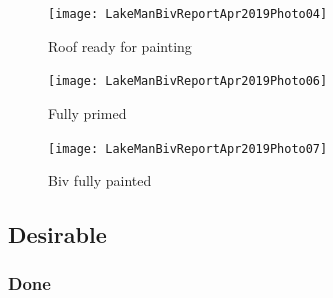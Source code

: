 \documentclass[12pt]{article} %
\begin{document}
\begin{figure}[ht]
\begin{minipage}{.5\linewidth}
\begin{flushleft}
  \texttt{[image: LakeManBivReportApr2019Photo04]}
  \caption{Roof ready for painting}
  \label{LMB4}
\end{flushleft}
\end{minipage}
\begin{minipage}{.5\linewidth}
\begin{center}
  \texttt{[image: LakeManBivReportApr2019Photo06]}
  \caption{Fully primed}
  \label{LMB6}
\end{center}
\end{minipage}
\end{figure}

\begin{figure}[ht]
\begin{minipage}{.5\linewidth}
\begin{flushleft}
  \texttt{[image: LakeManBivReportApr2019Photo07]}
  \caption{Biv fully painted}
  \label{LMB7}
\end{flushleft}
\end{minipage}
\end{figure}

\subsection{Desirable}

\subsubsection{Done}
\end{document}
